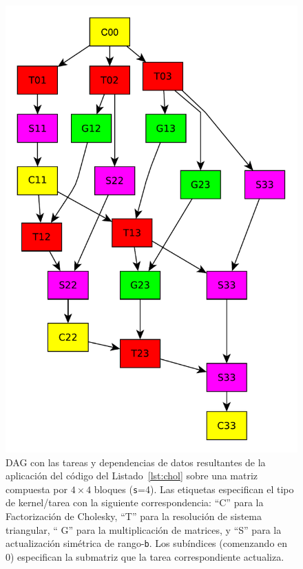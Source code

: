\begin{figure}%
\begin{center}
\includegraphics[scale=0.35]{Figures/4x4_TaskExample}
\end{center}
	\caption[DAG con las tareas y dependencias de datos resultantes de la aplicación del código en la Figura~\ref{lst:chol}
         sobre una matriz compuesta por $4 \times 4$ bloques ({\tt s}=4).]
	 {DAG con las tareas y dependencias de datos resultantes de la
           aplicación del código del Listado~\ref{lst:chol} sobre una
           matriz compuesta por $4 \times 4$ bloques ({\tt s}=4). Las
           etiquetas especifican el tipo de kernel/tarea con la siguiente
           correspondencia: ``{\sf C}'' para la Factorización de Cholesky,
           ``{\sf T}'' para la resolución de sistema triangular, ``{\sf
             G}'' para la multiplicación de matrices, y ``{\sf S}'' para la
           actualización simétrica de rango-{\tt b}.  Los subíndices
           (comenzando en 0) especifican la submatriz que la tarea
           correspondiente actualiza.}
\label{fig:dag}
\end{figure}

